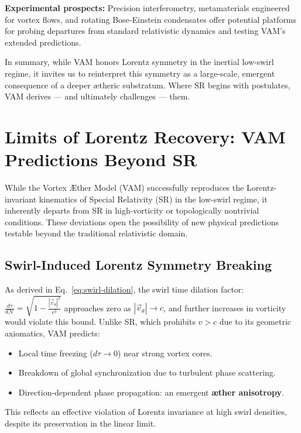 \documentclass[12pt]{article}
\begin{document}
    \textbf{Experimental prospects:} Precision interferometry, metamaterials engineered for vortex flows, and rotating Bose-Einstein condensates offer potential platforms for probing departures from standard relativistic dynamics and testing VAM’s extended predictions.

    In summary, while VAM honors Lorentz symmetry in the inertial low-swirl regime, it invites us to reinterpret this symmetry as a large-scale, emergent consequence of a deeper ætheric substratum. Where SR begins with postulates, VAM derives — and ultimately challenges — them.



\section*{Limits of Lorentz Recovery: VAM Predictions Beyond SR}

    While the Vortex Æther Model (VAM) successfully reproduces the Lorentz-invariant kinematics of Special Relativity (SR) in the low-swirl regime, it inherently departs from SR in high-vorticity or topologically nontrivial conditions. These deviations open the possibility of new physical predictions testable beyond the traditional relativistic domain.

    \subsection*{Swirl-Induced Lorentz Symmetry Breaking}
    As derived in Eq.~\eqref{eq:swirl-dilation}, the swirl time dilation factor: \( \frac{d\tau}{d\mathcal{N}} = \sqrt{1 - \frac{|\vec{v}_\theta|^2}{c^2}} \)
    approaches zero as \( |\vec{v}_\theta| \to c \), and further increases in vorticity would violate this bound. Unlike SR, which prohibits \( v > c \) due to its geometric axiomatics, VAM predicts:

    \begin{itemize}
        \item Local time freezing (\( d\tau \to 0 \)) near strong vortex cores.
        \item Breakdown of global synchronization due to turbulent phase scattering.
        \item Direction-dependent phase propagation: an emergent \textbf{æther anisotropy}.
    \end{itemize}

    This reflects an effective violation of Lorentz invariance at high swirl densities, despite its preservation in the linear limit.
\end{document}
